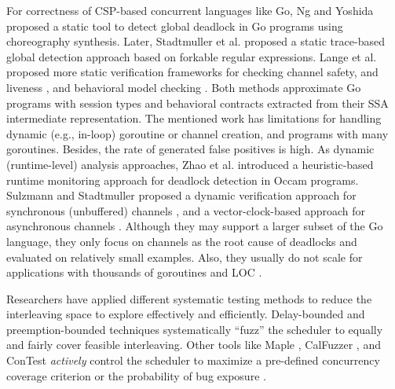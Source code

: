 For correctness of CSP-based concurrent languages like Go, Ng and Yoshida \cite{ng-dl-cc16} proposed a static tool to detect global deadlock in Go programs using choreography synthesis.
%
Later, Stadtmuller et al. \cite{stadtmuller-minigo-aplas16} proposed a static trace-based global detection approach based on forkable regular expressions.
%
Lange et al. proposed more static verification frameworks for checking channel safety, and liveness \cite{lange-fence-popl17}, and behavioral model checking \cite{lange-staticType-icse18}.
%
Both methods approximate Go programs with session types and behavioral contracts extracted from their SSA intermediate representation.
%
The mentioned work has limitations for handling dynamic (e.g., in-loop) goroutine or channel creation, and programs with many goroutines. Besides, the rate of generated false positives is high.
%
As dynamic (runtime-level) analysis approaches, Zhao et al. \cite{zhao-occam97} introduced a heuristic-based runtime monitoring approach for deadlock detection in Occam programs.
%
Sulzmann and Stadtmuller proposed a dynamic verification approach for synchronous (unbuffered) channels \cite{sulzmann-corr17}, and a vector-clock-based approach for asynchronous channels \cite{sulzmann-twophase-2018}.
%
Although they may support a larger subset of the Go language, they only focus on channels as the root cause of deadlocks and evaluated on relatively small examples.
%
Also, they usually do not scale for applications with thousands of goroutines and LOC \cite{dilley-empirical-saner19}.

%
Researchers have applied different systematic testing methods \cite{thomson-concurrencyTesting-ppopp14} to reduce the interleaving space to explore effectively and efficiently.
%
Delay-bounded \cite{emmi-delayBounded-popl11,burckhardt-depthBug-asplos10} and preemption-bounded \cite{madanlal-preemptionBound-pldi07} techniques systematically ``fuzz'' the scheduler to equally and fairly cover feasible interleaving.
%
Other tools like Maple \cite{yu-maple-oopsla12}, CalFuzzer \cite{joshi-calfuzzer},  and ConTest \cite{edelstein2003contest} \textit{actively} control the scheduler to maximize a pre-defined concurrency coverage criterion \cite{hong-syncTesting-issta12} or the probability of bug exposure \cite{burckhardt-depthBug-asplos10}.
